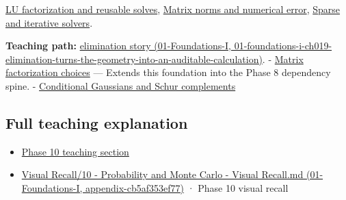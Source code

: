 \hyperref[appendix-55e4b5b0a1e6]{LU factorization and reusable solves}, \hyperref[appendix-f8657bac66e5]{Matrix norms and numerical error}, \hyperref[appendix-67c87a3d9e94]{Sparse and iterative solvers}.

\textbf{Teaching path:} \href{../01-Foundations-I/main.pdf\#nameddest=01-foundations-i-ch019-elimination-turns-the-geometry-into-an-auditable-calculation}{elimination story (01-Foundations-I, 01-foundations-i-ch019-elimination-turns-the-geometry-into-an-auditable-calculation)}. - \hyperref[appendix-221a483bec2d]{Matrix factorization choices} --- Extends this foundation into the Phase 8 dependency spine. - \hyperref[appendix-f0437ea55a47]{Conditional Gaussians and Schur complements}

\subsection{Full teaching explanation}\label{appendix-f6e77f4a200f-full-teaching-explanation}

\begin{itemize}
\tightlist
\item
  \hyperref[02-foundations-ii-ch024-waiting-times-event-counts-and-covariance-geometry]{Phase 10 teaching section}
\item
  \href{../01-Foundations-I/main.pdf\#nameddest=appendix-cb5af353ef77}{Visual Recall/10 - Probability and Monte Carlo - Visual Recall.md (01-Foundations-I, appendix-cb5af353ef77)} · Phase 10 visual recall
\end{itemize}
